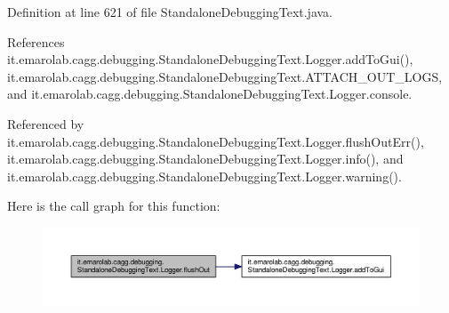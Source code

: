 Definition at line 621 of file Standalone\-Debugging\-Text.\-java.



References it.\-emarolab.\-cagg.\-debugging.\-Standalone\-Debugging\-Text.\-Logger.\-add\-To\-Gui(), it.\-emarolab.\-cagg.\-debugging.\-Standalone\-Debugging\-Text.\-A\-T\-T\-A\-C\-H\-\_\-\-O\-U\-T\-\_\-\-L\-O\-G\-S, and it.\-emarolab.\-cagg.\-debugging.\-Standalone\-Debugging\-Text.\-Logger.\-console.



Referenced by it.\-emarolab.\-cagg.\-debugging.\-Standalone\-Debugging\-Text.\-Logger.\-flush\-Out\-Err(), it.\-emarolab.\-cagg.\-debugging.\-Standalone\-Debugging\-Text.\-Logger.\-info(), and it.\-emarolab.\-cagg.\-debugging.\-Standalone\-Debugging\-Text.\-Logger.\-warning().



Here is the call graph for this function\-:
\nopagebreak
\begin{figure}[H]
\begin{center}
\leavevmode
\includegraphics[width=350pt]{classit_1_1emarolab_1_1cagg_1_1debugging_1_1StandaloneDebuggingText_1_1Logger_a183a06eb65bc84345773a5f75c977021_cgraph}
\end{center}
\end{figure}



